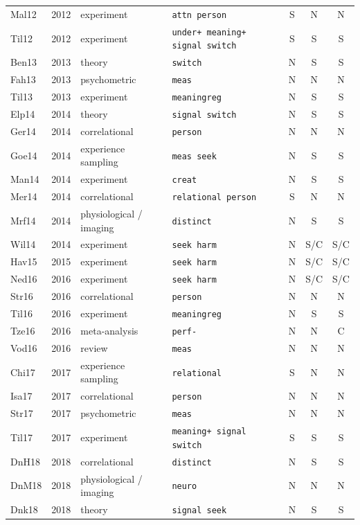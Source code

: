 {\begin{longtable}{@{}lrllccc@{}}
Mal12 & 2012 & experiment & \texttt{attn person} & S & N & N \\
Til12 & 2012 & experiment & \texttt{under+ meaning+ signal switch} & S & S & S \\
Ben13 & 2013 & theory & \texttt{switch} & N & S & S \\
Fah13 & 2013 & psychometric & \texttt{meas} & N & N & N \\
Til13 & 2013 & experiment & \texttt{meaningreg} & N & S & S \\
Elp14 & 2014 & theory & \texttt{signal switch} & N & S & S \\
Ger14 & 2014 & correlational & \texttt{person} & N & N & N \\
Goe14 & 2014 & experience sampling & \texttt{meas seek} & N & S & S \\
Man14 & 2014 & experiment & \texttt{creat} & N & S & S \\
Mer14 & 2014 & correlational & \texttt{relational person} & S & N & N \\
Mrf14 & 2014 & physiological / imaging & \texttt{distinct} & N & S & S \\
Wil14 & 2014 & experiment & \texttt{seek harm} & N & S/C & S/C \\
Hav15 & 2015 & experiment & \texttt{seek harm} & N & S/C & S/C \\
Ned16 & 2016 & experiment & \texttt{seek harm} & N & S/C & S/C \\
Str16 & 2016 & correlational & \texttt{person} & N & N & N \\
Til16 & 2016 & experiment & \texttt{meaningreg} & N & S & S \\
Tze16 & 2016 & meta-analysis & \texttt{perf-} & N & N & C \\
Vod16 & 2016 & review & \texttt{meas} & N & N & N \\
Chi17 & 2017 & experience sampling & \texttt{relational} & S & N & N \\
Isa17 & 2017 & correlational & \texttt{person} & N & N & N \\
Str17 & 2017 & psychometric & \texttt{meas} & N & N & N \\
Til17 & 2017 & experiment & \texttt{meaning+ signal switch} & S & S & S \\
DnH18 & 2018 & correlational & \texttt{distinct} & N & S & S \\
DnM18 & 2018 & physiological / imaging & \texttt{neuro} & N & N & N \\
Dnk18 & 2018 & theory & \texttt{signal seek} & N & S & S \\

\end{longtable}}
